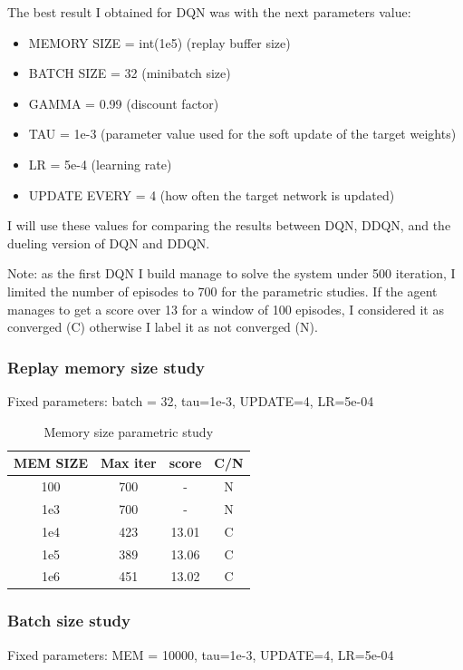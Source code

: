\documentclass[12pt]{article}
\begin{document}
The best result I obtained for DQN was with the next parameters value:
\begin{itemize}
\item MEMORY SIZE = int(1e5) (replay buffer size)
\item BATCH SIZE = 32  (minibatch size)
\item GAMMA = 0.99  (discount factor)
\item TAU = 1e-3  (parameter value used for the soft update of the target weights)
\item LR = 5e-4  (learning rate)
\item UPDATE EVERY = 4  (how often the target network is updated)
\end{itemize}

I will use these values for comparing the results between DQN, DDQN, and the dueling version of DQN and DDQN.

Note: as the first DQN I build manage to solve the system under 500 iteration, I limited the number of episodes to 700 for the parametric studies.  If the agent manages to get a score over 13 for a window of 100 episodes, I considered it as converged (C) otherwise I label it as not converged (N).


\subsubsection{Replay memory size study}
Fixed parameters: batch = 32, tau=1e-3, UPDATE=4, LR=5e-04

\begin{table}[H]
\centering
\begin{tabular}{|c|c|c|c|}
\hline 
{ \textbf{MEM SIZE}} & { \textbf{Max iter}} & { \textbf{score}} & { \textbf{C/N}} \\ \hline
100 & 700 & -     & N \\ \hline
1e3 & 700 & -     & N \\ \hline
1e4 & 423 & 13.01 & C \\ \hline
1e5 & 389 & 13.06 & C \\ \hline
1e6 & 451 & 13.02 & C \\ \hline
\end{tabular}
\caption{Memory size parametric study}
\label{table:Mem}
\end{table}



\subsubsection{Batch size study}
Fixed parameters: MEM = 10000, tau=1e-3, UPDATE=4, LR=5e-04
\end{document}
